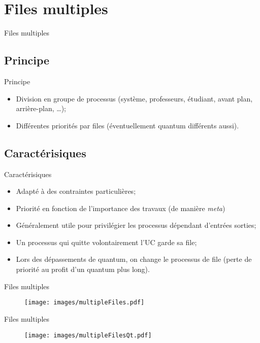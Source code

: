 \def\sectitle{Files multiples}
\section{\sectitle}
\begin{frame}{\sectitle}
    \def\subsectitle{Principe}
    \subsection{\subsectitle}

    \begin{block}{\subsectitle}
        \begin{itemize}
            \item Division en groupe de processus (système, professeurs,
                étudiant, avant plan, arrière-plan, \dots);
            \item Différentes priorités par files (éventuellement quantum
                différents aussi).
        \end{itemize}
    \end{block}


    \def\subsectitle{Caractérisiques}
    \subsection{\subsectitle}
    \begin{block}{\subsectitle}
        \begin{itemize}
            \item Adapté à des contraintes particulières;
            \item Priorité en fonction de l'importance des travaux (de manière
                \textit{meta})
            \item Généralement utile pour privilégier les processus dépendant
                d'entrées sorties;
            \item Un processus qui quitte volontairement l'UC garde sa file;
            \item Lors des dépassements de quantum, on change le processus de
                file (perte de priorité au profit d'un quantum plus long).
        \end{itemize}
    \end{block}
\end{frame}

\begin{frame}{\sectitle}
    \begin{figure}
        \texttt{[image: images/multipleFiles.pdf]}
    \end{figure}
\end{frame}


\begin{frame}{\sectitle}
    \begin{figure}
        \texttt{[image: images/multipleFilesQt.pdf]}
    \end{figure}
\end{frame}



